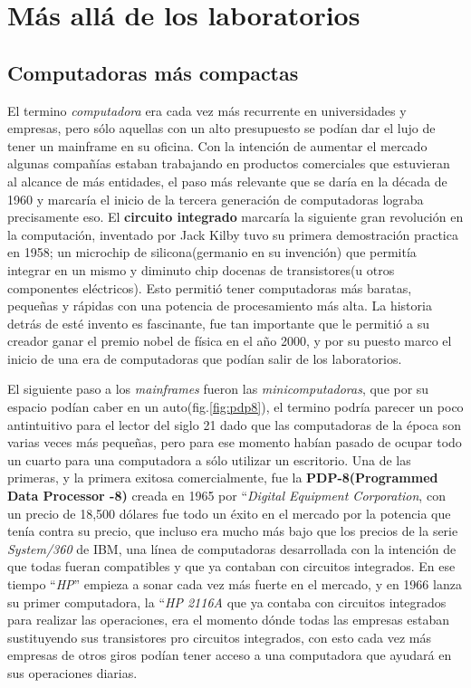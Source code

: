 \documentclass[letterpaper,12pt,oneside]{book}
\begin{document}
	\section{Más allá de los laboratorios}
		
		\subsection{Computadoras más compactas}
		

		El termino \textit{computadora}	era cada vez más recurrente en universidades y empresas, pero sólo aquellas con un alto presupuesto se podían
		dar el lujo de tener un mainframe en su oficina. Con la intención de aumentar el mercado algunas compañías estaban trabajando en productos
		comerciales que estuvieran al alcance de más entidades, el paso más relevante que se daría en la década de 1960 y marcaría el inicio de la tercera generación
		de computadoras lograba precisamente eso. El \textbf{circuito integrado} marcaría la siguiente gran revolución en la computación, inventado por
		Jack Kilby tuvo su primera demostración practica en 1958; un microchip de silicona(germanio en su invención) que permitía integrar
		en un mismo y diminuto chip docenas de transistores(u otros componentes eléctricos). Esto permitió tener computadoras más baratas, pequeñas y rápidas con una potencia 
		de procesamiento más
		alta. La historia detrás de esté invento es fascinante, fue tan importante que le permitió a su creador ganar el premio
		nobel de física en el año 2000, y por su puesto marco el inicio de una era de computadoras que podían salir de los laboratorios\cite{null_essentials_2003}.
		
		
		El siguiente paso a los \textit{mainframes} fueron las \textit{minicomputadoras}, que por su espacio podían caber en un auto(fig.\ref{fig:pdp8}),
		el termino podría parecer un poco antintuitivo para el lector del siglo 21 dado que las computadoras de la época son varias veces más pequeñas, pero
		para ese momento habían pasado de ocupar todo un cuarto para una computadora a sólo utilizar un escritorio. Una de las primeras, y la primera
		exitosa comercialmente, fue la \textbf{PDP-8(Programmed Data Processor -8)} creada en 1965 por ``\textit{Digital Equipment Corporation}, con un precio
		de 18,500 dólares fue todo un éxito en el mercado por la potencia que tenía contra su precio, que incluso era mucho más bajo que los precios de la serie
		\textit{System/360} de IBM, una línea de computadoras desarrollada con la intención de que todas fueran compatibles y que ya contaban con circuitos
		integrados\cite{null_essentials_2003}. En ese tiempo ``\textit{HP}'' empieza a sonar cada vez más fuerte en el mercado, y en 1966 lanza su primer computadora, la ``\textit{HP 2116A}
		que ya contaba con circuitos integrados para realizar las operaciones, era el momento dónde todas las empresas estaban sustituyendo sus
		transistores pro circuitos integrados, con esto cada vez más empresas de otros giros podían tener acceso a una computadora que 
		ayudará en sus operaciones diarias\cite{computer_history_museum_computers_nodate}.
		
\end{document}
